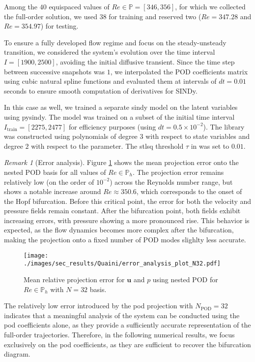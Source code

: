 \documentclass[reqno]{amsart}[standalone]
\theoremstyle{definition}
\theoremstyle{remark}
\newtheorem{remark}[definition]{Remark}
\newcommand{\bs}{\boldsymbol}
\begin{document}
Among the $40$ equispaced values of $Re\in\mathbb{P}=[346, 356]$, for which we collected the full-order solution, we used $38$ for training and reserved two ($Re=347.28$ and $Re=354.97$) for testing.
%

To ensure a fully developed flow regime and focus on the steady-unsteady transition, we considered the system's evolution over the time interval $I=[1900, 2500]$, avoiding the initial diffusive transient.
Since the time step between successive snapshots was $1$, we interpolated the POD coefficients matrix using cubic natural spline functions and evaluated them at intervals of $dt=0.01$ seconds to ensure smooth computation of derivatives for SINDy.


In this case as well, we trained a separate \gls{sindy} model on the latent variables using pysindy.
The model was trained on a subset of the initial time interval $I_\text{train}=[2275, 2477]$ for efficiency purposes (using $dt=0.5\times10^{-2}$).
The library was constructed using polynomials of degree $3$ with respect to state variables and degree $2$ with respect to the parameter.
%
The \gls{stlsq} threshold $\tau$ in was set to $0.01$.
%


\begin{remark}[Error analysis]

Figure \ref{figERR_NESTED_POD} shows the mean projection error onto the nested POD basis for all values of $Re\in \mathbb{P}_h$. The projection error remains relatively low (on the order of $10^{-2}$) across the Reynolds number range, but shows a notable increase around $Re\approx 350.6$, which corresponds to the onset of the Hopf bifurcation. Before this critical point, the error for both the velocity and pressure fields remain constant. After the bifurcation point, both fields exhibit increasing errors, with pressure showing a more pronounced rise. This behavior is expected, as the flow dynamics becomes more complex after the bifurcation, making the projection onto a fixed number of POD modes slighlty less accurate.
%

\begin{figure}[htbp]
\texttt{[image: ./images/sec\_results/Quaini/error\_analysis\_plot\_N32.pdf]}
\caption{Mean relative projection error for $\bs{u}$ and $p$ using nested POD for $Re\in\mathbb{P}_h$ with $N=32$ basis.}
\label{figERR_NESTED_POD}
\end{figure}

The relatively low error introduced by the \gls{pod} projection with $N_\text{POD}=32$ indicates that a meaningful analysis of the system can be conducted using the \gls{pod} coefficients alone, as they provide a sufficiently accurate representation of the full-order trajectories. Therefore, in the following numerical results, we focus exclusively on the \gls{pod} coefficients, as they are sufficient to recover the bifurcation diagram.
%
%
\end{remark}
\end{document}
